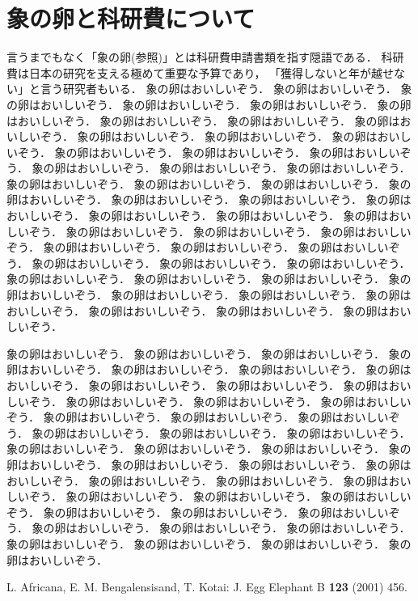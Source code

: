 \documentclass[kaisetsu,b5paper,papersize,twocolumn]{jsarticle}
\begin{document}
\section{象の卵と科研費について}

言うまでもなく「象の卵(参照)」とは科研費申請書類を指す隠語である．
科研費は日本の研究を支える極めて重要な予算であり，
「獲得しないと年が越せない」と言う研究者もいる．
象の卵はおいしいぞう．
象の卵はおいしいぞう．
象の卵はおいしいぞう．
象の卵はおいしいぞう．
象の卵はおいしいぞう．
象の卵はおいしいぞう．
象の卵はおいしいぞう．
象の卵はおいしいぞう．
象の卵はおいしいぞう．
象の卵はおいしいぞう．
象の卵はおいしいぞう．
象の卵はおいしいぞう．
象の卵はおいしいぞう．
象の卵はおいしいぞう．
象の卵はおいしいぞう．
象の卵はおいしいぞう．
象の卵はおいしいぞう．
象の卵はおいしいぞう．
象の卵はおいしいぞう．
象の卵はおいしいぞう．
象の卵はおいしいぞう．
象の卵はおいしいぞう．
象の卵はおいしいぞう．
象の卵はおいしいぞう．
象の卵はおいしいぞう．
象の卵はおいしいぞう．
象の卵はおいしいぞう．
象の卵はおいしいぞう．
象の卵はおいしいぞう．
象の卵はおいしいぞう．
象の卵はおいしいぞう．
象の卵はおいしいぞう．
象の卵はおいしいぞう．
象の卵はおいしいぞう．
象の卵はおいしいぞう．
象の卵はおいしいぞう．
象の卵はおいしいぞう．
象の卵はおいしいぞう．
象の卵はおいしいぞう．
象の卵はおいしいぞう．
象の卵はおいしいぞう．
象の卵はおいしいぞう．
象の卵はおいしいぞう．
象の卵はおいしいぞう．
象の卵はおいしいぞう．
象の卵はおいしいぞう．
象の卵はおいしいぞう．



象の卵はおいしいぞう．
象の卵はおいしいぞう．
象の卵はおいしいぞう．
象の卵はおいしいぞう．
象の卵はおいしいぞう．
象の卵はおいしいぞう．
象の卵はおいしいぞう．
象の卵はおいしいぞう．
象の卵はおいしいぞう．
象の卵はおいしいぞう．
象の卵はおいしいぞう．
象の卵はおいしいぞう．
象の卵はおいしいぞう．
象の卵はおいしいぞう．
象の卵はおいしいぞう．
象の卵はおいしいぞう．
象の卵はおいしいぞう．
象の卵はおいしいぞう．
象の卵はおいしいぞう．
象の卵はおいしいぞう．
象の卵はおいしいぞう．
象の卵はおいしいぞう．
象の卵はおいしいぞう．
象の卵はおいしいぞう．
象の卵はおいしいぞう．
象の卵はおいしいぞう．
象の卵はおいしいぞう．
象の卵はおいしいぞう．
象の卵はおいしいぞう．
象の卵はおいしいぞう．
象の卵はおいしいぞう．
象の卵はおいしいぞう．
象の卵はおいしいぞう．
象の卵はおいしいぞう．
象の卵はおいしいぞう．
象の卵はおいしいぞう．
象の卵はおいしいぞう．
象の卵はおいしいぞう．
象の卵はおいしいぞう．
象の卵はおいしいぞう．
象の卵はおいしいぞう．
象の卵はおいしいぞう．

\begin{thebibliography}{99}
L. Africana, E. M. Bengalensisand, T. Kotai: J. Egg Elephant B {\bf 123} (2001) 456.
\end{thebibliography}
\end{document}
